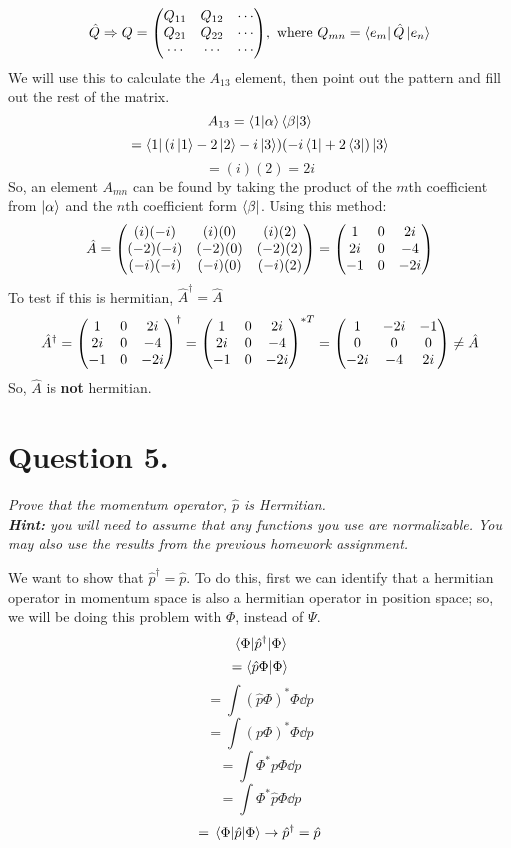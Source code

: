 \documentclass[12pt]{article}
\begin{document}
\begin{enumerate}[label=\alph*)]
\[\hat{Q} \Rightarrow Q = \mqty(Q_{11} & Q_{12} & \cdots \\ Q_{21} & Q_{22} & \cdots \\ \cdots & \cdots & \cdots), \text{ where } Q_{mn} = \bra{e_m}\hat{Q}\ket{e_n}\]
We will use this to calculate the $A_{13}$ element, then point out the pattern and fill out the rest of the matrix.
\[A_{13} = \braket{1}{\alpha}\braket{\beta}{3}\]
\[= \bra{1}(i\ket{1} -2\ket{2} -i\ket{3})(-i\bra{1} +2\bra{3})\ket{3}\]
\[= (i)(2) = 2i\]
So, an element $A_{mn}$ can be found by taking the product of the $m$th coefficient from $\ket{\alpha}$ and the $n$th coefficient form $\bra{\beta}$. Using this method:
\[\hat{A} = \mqty((i)(-i)&(i)(0)&(i)(2) \\ (-2)(-i)&(-2)(0)&(-2)(2) \\ (-i)(-i)&(-i)(0)&(-i)(2)) = \mqty(1&0&2i \\ 2i&0&-4 \\ -1&0&-2i)\]
To test if this is hermitian, $\hat{A}^\dagger = \hat{A}$
\[\hat{A}^\dagger = \mqty(1&0&2i \\ 2i&0&-4 \\ -1&0&-2i)^\dagger = \mqty(1&0&2i \\ 2i&0&-4 \\ -1&0&-2i)^{*T} = \mqty(1&-2i&-1 \\ 0&0&0 \\ -2i&-4&2i) \neq \hat{A}\]
So, $\hat{A}$ is \textbf{not} hermitian. 

\end{enumerate}

\newpage

\section*{Question 5.}
\emph{Prove that the momentum operator, $\hat{p}$ is Hermitian.}\\
\emph{\textbf{Hint:} you will need to assume that any functions you use are normalizable. You may also use the results from the previous homework assignment.}\bigskip

We want to show that $\hat{p}^\dagger = \hat{p}$. To do this, first we can identify that a hermitian operator in momentum space is also a hermitian operator in position space; so, we will be doing this problem with $\Phi$, instead of $\Psi$. 
\[\ev{\hat{p}^\dagger}{\Phi}\]
\[=\braket{\hat{p}\Phi}{\Phi}\]
\[=\int (\hat{p}\Phi)^* \Phi \dd{p}\]
\[=\int (p \Phi)^* \Phi \dd{p}\]
\[=\int \Phi^* p \Phi \dd{p}\]
\[=\int \Phi^* \hat{p} \Phi \dd{p}\]
\[= \ev{\hat{p}}{\Phi} \rightarrow \hat{p}^\dagger = \hat{p}\]
\end{document}

